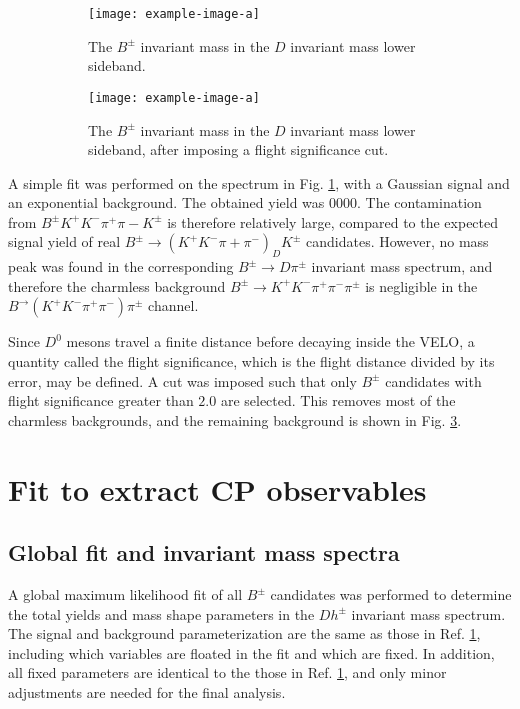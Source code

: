 \documentclass[12pt, a4paper, notitlepage, onecolumn]{article}
\numberwithin{equation}{section}
\begin{document}
\begin{figure}[H] 
  \centering
  \begin{subfigure}{0.5\textwidth}
    \centering
    \texttt{[image: example-image-a]}
    \caption{The $B^\pm$ invariant mass in the $D$ invariant mass lower sideband.}
    \label{fig_Bmass_charmless}
  \end{subfigure}%
  \begin{subfigure}{0.5\textwidth}
    \centering
    \texttt{[image: example-image-a]}
    \caption{The $B^\pm$ invariant mass in the $D$ invariant mass lower sideband, after imposing a flight significance cut.}
    \label{fig_Bmass_charmless_fdcut}
  \end{subfigure}
  \caption{}
\end{figure}

A simple fit was performed on the spectrum in Fig. \ref{fig_Bmass_charmless}, with a Gaussian signal and an exponential background. The obtained yield was $0000$. The contamination from $B^\pm K^+K^-\pi^+\pi-K^\pm$ is therefore relatively large, compared to the expected signal yield of real $B^\pm\to (K^+K^-\pi+\pi^-)_DK^\pm$ candidates. However, no mass peak was found in the corresponding $B^\pm\to D\pi^\pm$ invariant mass spectrum, and therefore the charmless background $B^\pm\to K^+K^-\pi^+\pi^-\pi^\pm$ is negligible in the $B^\to (K^+K^-\pi^+\pi^-)\pi^\pm$ channel.

Since $D^0$ mesons travel a finite distance before decaying inside the VELO, a quantity called the flight significance, which is the flight distance divided by its error, may be defined. A cut was imposed such that only $B^\pm$ candidates with flight significance greater than $2.0$ are selected. This removes most of the charmless backgrounds, and the remaining background is shown in Fig. \ref{fig_Bmass_charmless_fdcut}.
\section{Fit to extract CP observables}
\subsection{Global fit and invariant mass spectra}
\label{section_global_fit}
\noindent A global maximum likelihood fit of all $B^\pm$ candidates was performed to determine the total yields and mass shape parameters in the $Dh^\pm$ invariant mass spectrum. The signal and background parameterization are the same as those in Ref. \ref{}, including which variables are floated in the fit and which are fixed. In addition, all fixed parameters are identical to the those in Ref. \ref{}, and only minor adjustments are needed for the final analysis.
\end{document}
